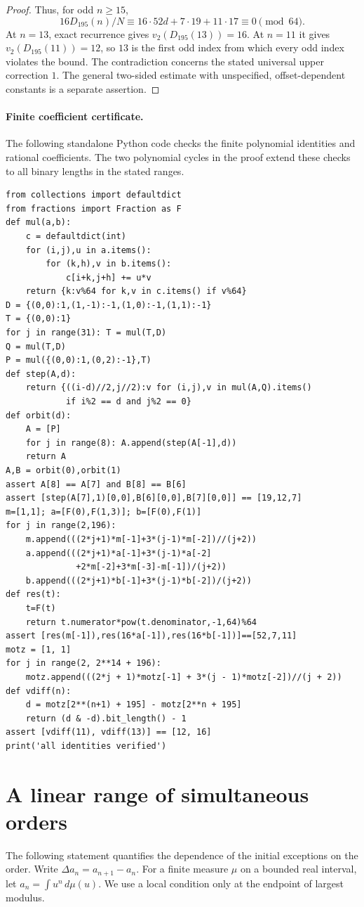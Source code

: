 \documentclass[11pt,a4paper]{article}
\begin{document}
\begin{proof}
Thus, for odd $n\ge15$,
\[
 16D_{195}(n)/N\equiv 16\cdot52 d+7\cdot19+11\cdot17
 \equiv0\pmod{64}.
\]
At $n=13$, exact recurrence gives $v_2(D_{195}(13))=16$.
At $n=11$ it gives $v_2(D_{195}(11))=12$, so $13$ is the first odd
index from which every odd index violates the bound. The contradiction concerns the
stated universal upper correction $1$. The general two-sided estimate
with unspecified, offset-dependent constants is a separate assertion.
\end{proof}

\paragraph{Finite coefficient certificate.}
The following standalone Python code checks the finite polynomial
identities and rational coefficients. The two polynomial cycles in the
proof extend these checks to all binary lengths in the stated ranges.
{\footnotesize\begin{verbatim}
from collections import defaultdict
from fractions import Fraction as F
def mul(a,b):
    c = defaultdict(int)
    for (i,j),u in a.items():
        for (k,h),v in b.items():
            c[i+k,j+h] += u*v
    return {k:v%64 for k,v in c.items() if v%64}
D = {(0,0):1,(1,-1):-1,(1,0):-1,(1,1):-1}
T = {(0,0):1}
for j in range(31): T = mul(T,D)
Q = mul(T,D)
P = mul({(0,0):1,(0,2):-1},T)
def step(A,d):
    return {((i-d)//2,j//2):v for (i,j),v in mul(A,Q).items()
            if i%2 == d and j%2 == 0}
def orbit(d):
    A = [P]
    for j in range(8): A.append(step(A[-1],d))
    return A
A,B = orbit(0),orbit(1)
assert A[8] == A[7] and B[8] == B[6]
assert [step(A[7],1)[0,0],B[6][0,0],B[7][0,0]] == [19,12,7]
m=[1,1]; a=[F(0),F(1,3)]; b=[F(0),F(1)]
for j in range(2,196):
    m.append(((2*j+1)*m[-1]+3*(j-1)*m[-2])//(j+2))
    a.append(((2*j+1)*a[-1]+3*(j-1)*a[-2]
              +2*m[-2]+3*m[-3]-m[-1])/(j+2))
    b.append(((2*j+1)*b[-1]+3*(j-1)*b[-2])/(j+2))
def res(t):
    t=F(t)
    return t.numerator*pow(t.denominator,-1,64)%64
assert [res(m[-1]),res(16*a[-1]),res(16*b[-1])]==[52,7,11]
motz = [1, 1]
for j in range(2, 2**14 + 196):
    motz.append(((2*j + 1)*motz[-1] + 3*(j - 1)*motz[-2])//(j + 2))
def vdiff(n):
    d = motz[2**(n+1) + 195] - motz[2**n + 195]
    return (d & -d).bit_length() - 1
assert [vdiff(11), vdiff(13)] == [12, 16]
print('all identities verified')
\end{verbatim}}
\section{A linear range of simultaneous orders}
\label{sec:linear}
The following statement quantifies the dependence of the initial exceptions on the order. Write $\Delta a_n=a_{n+1}-a_n$. For a finite measure $\mu$ on a bounded real interval, let $a_n=\int u^n\,d\mu(u)$. We use a local condition only at the endpoint of largest modulus.
\end{document}
